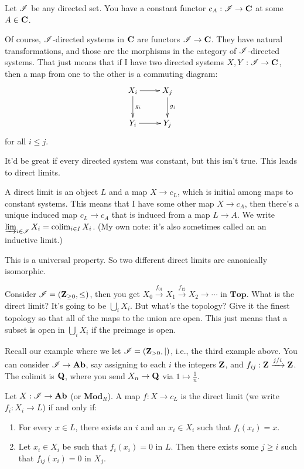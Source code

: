 \begin{example}
Let $\mathscr I$ be any directed set. You have a constant functor $c_A:\mathscr I\to\mathbf C$ at some $A\in\mathbf C$.
\end{example}
Of course, $\mathscr I$-directed systems in $\mathbf C$ are functors $\mathscr I\to\mathbf C$. They have natural transformations, and those are the morphisms in the category of $\mathscr I$-directed systems. That just means that if I have two directed systems $X,Y:\mathscr I\to\mathbf C$, then a map from one to the other is a commuting diagram:
\begin{equation*}
\xymatrix{X_i\ar[r]\ar[d]^{g_i} & X_j\ar[d]^{g_j}\\
Y_i\ar[r] & Y_j}
\end{equation*}
for all $i\leq j$.

It'd be great if every directed system was constant, but this isn't true. This leads to direct limits.
\begin{definition}
A direct limit is an object $L$ and a map $X\to c_L$, which is initial among maps to constant systems. This means that I have some other map $X\to c_A$, then there's a unique induced map $c_L\to c_A$ that is induced from a map $L\to A$. We write $\varinjlim_{i\in \mathscr I}X_i=\operatorname{colim}_{i\in I}X_i$. (My own note: it's also sometimes called an an inductive limit.)
\end{definition}
This is a universal property. So two different direct limits are canonically isomorphic.
\begin{example}
Consider $\mathscr I=(\mathbf Z_{\geq 0},\leq)$, then you get $X_0\xrightarrow{f_{01}}X_1\xrightarrow{f_{12}}X_2\to\cdots$ in $\mathbf{Top}$. What is the direct limit? It's going to be $\bigcup_i X_i$. But what's the topology? Give it the finest topology so that all of the maps to the union are open. This just means that a subset is open in $\bigcup_i X_i$ if the preimage is open.
\end{example}
\begin{example}
Recall our example where we let $\mathscr I=(\mathbf Z_{>0},|)$, i.e., the third example above. You can consider $\mathscr I\to\mathbf{Ab}$, say assigning to each $i$ the integers $\mathbf Z$, and $f_{ij}:\mathbf Z\xrightarrow{j/i}\mathbf Z$. The colimit is $\mathbf Q$, where you send $X_n\to\mathbf Q$ via $1\mapsto \frac{1}{n}$.
\end{example}
\begin{lemma}
Let $X:\mathscr I\to\mathbf{Ab}$ (or $\mathbf{Mod}_R$). A map $f:X\to c_L$ is the direct limit (we write $f_i:X_i\to L$) if and only if:
\begin{enumerate}
\item For every $x\in L$, there exists an $i$ and an $x_i\in X_i$ such that $f_i(x_i)=x$.
\item Let $x_i\in X_i$ be such that $f_i(x_i)=0$ in $L$. Then there exists some $j\geq i$ such that $f_{ij}(x_i)=0$ in $X_j$.
\end{enumerate}
\end{lemma}
